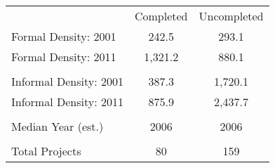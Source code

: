 \begin{tabu}{lcc}
 & Completed & Uncompleted \\ 
 Formal Density: 2001  & 242.5  & 293.1  \\ 
 Formal Density: 2011  & 1,321.2  & 880.1  \\ 
 &  &  \\ 
 Informal Density: 2001  & 387.3  & 1,720.1  \\ 
 Informal Density: 2011  & 875.9  & 2,437.7  \\ 
 &  &  \\ 
 Median Year (est.)  & 2006  & 2006  \\ 
 &  &  \\ 
 Total Projects   & 80  & 159  \\ 
\bottomrule
\end{tabu}

